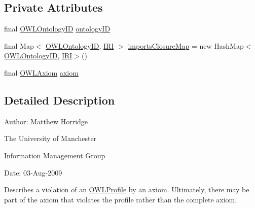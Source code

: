 \subsection*{Private Attributes}
\begin{DoxyCompactItemize}
\item 
final \hyperlink{classorg_1_1semanticweb_1_1owlapi_1_1model_1_1_o_w_l_ontology_i_d}{O\-W\-L\-Ontology\-I\-D} \hyperlink{classorg_1_1semanticweb_1_1owlapi_1_1profiles_1_1_o_w_l_profile_violation_adea2b3a2528f714d832b677c8ff17c88}{ontology\-I\-D}
\item 
final Map$<$ \hyperlink{classorg_1_1semanticweb_1_1owlapi_1_1model_1_1_o_w_l_ontology_i_d}{O\-W\-L\-Ontology\-I\-D}, \hyperlink{classorg_1_1semanticweb_1_1owlapi_1_1model_1_1_i_r_i}{I\-R\-I} $>$ \hyperlink{classorg_1_1semanticweb_1_1owlapi_1_1profiles_1_1_o_w_l_profile_violation_a1b0d872faf1f9b0d54437a85cd35fe0b}{imports\-Closure\-Map} = new Hash\-Map$<$\hyperlink{classorg_1_1semanticweb_1_1owlapi_1_1model_1_1_o_w_l_ontology_i_d}{O\-W\-L\-Ontology\-I\-D}, \hyperlink{classorg_1_1semanticweb_1_1owlapi_1_1model_1_1_i_r_i}{I\-R\-I}$>$()
\item 
final \hyperlink{interfaceorg_1_1semanticweb_1_1owlapi_1_1model_1_1_o_w_l_axiom}{O\-W\-L\-Axiom} \hyperlink{classorg_1_1semanticweb_1_1owlapi_1_1profiles_1_1_o_w_l_profile_violation_aa7c8e8910ed3966f64a2c003fb516214}{axiom}
\end{DoxyCompactItemize}


\subsection{Detailed Description}
Author\-: Matthew Horridge\par
 The University of Manchester\par
 Information Management Group\par
 Date\-: 03-\/\-Aug-\/2009

Describes a violation of an \hyperlink{interfaceorg_1_1semanticweb_1_1owlapi_1_1profiles_1_1_o_w_l_profile}{O\-W\-L\-Profile} by an axiom. Ultimately, there may be part of the axiom that violates the profile rather than the complete axiom. 

